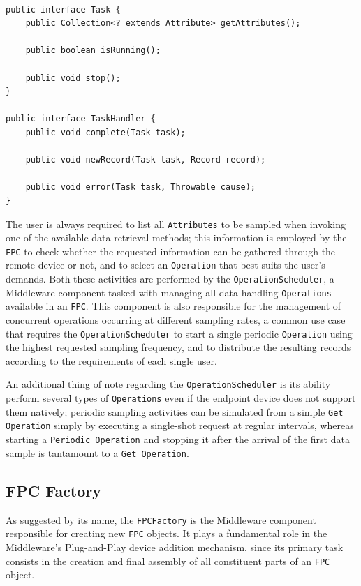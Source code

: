 ~\\
\lstset{language=java}
\begin{lstlisting}[caption={The \texttt{Task} and \texttt{TaskHandler}
interfaces.},label={lst:task}]
public interface Task {
    public Collection<? extends Attribute> getAttributes();

    public boolean isRunning();

    public void stop();
}

public interface TaskHandler {
    public void complete(Task task);

    public void newRecord(Task task, Record record);

    public void error(Task task, Throwable cause);
}
\end{lstlisting}

The user is always required to list all \texttt{Attributes} to be sampled when
invoking one of the available data retrieval methods; this information is
employed by the \texttt{FPC} to check whether the requested information can be
gathered through the remote device or not, and to select an \texttt{Operation}
that best suits the user's demands. Both these activities are performed by the
\texttt{OperationScheduler}, a Middleware component tasked with managing all
data handling \texttt{Operations} available in an \texttt{FPC}. This component
is also responsible for the management of concurrent operations occurring at
different sampling rates, a common use case that requires the
\texttt{OperationScheduler} to start a single periodic \texttt{Operation} using
the highest requested sampling frequency, and to distribute the resulting
records according to the requirements of each single user.

An additional thing of note regarding the \texttt{OperationScheduler} is its
ability perform several types of \texttt{Operations} even if the endpoint
device does not support them natively; periodic sampling activities can be
simulated from a simple \texttt{Get Operation} simply by executing a
single-shot request at regular intervals, whereas starting a \texttt{Periodic
Operation} and stopping it after the arrival of the first data sample is
tantamount to a \texttt{Get Operation}.


\subsection{FPC Factory}

As suggested by its name, the \texttt{FPCFactory} is the Middleware component
responsible for creating new \texttt{FPC} objects. It plays a fundamental role
in the Middleware's Plug-and-Play device addition mechanism, since its primary
task consists in the creation and final assembly of all constituent parts of an
\texttt{FPC} object.

